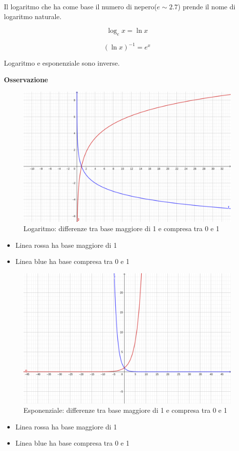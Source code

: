\documentclass{article}
\begin{document}
Il logaritmo che ha come base il numero di nepero($e \sim 2.7$) prende il nome di logaritmo naturale.


\begin{equation*}
    \log_e x = \ln x
\end{equation*}

\begin{equation*}
    (\ln x)^{-1} = e^x
\end{equation*}

Logaritmo e esponenziale sono inverse.

\textbf{Osservazione}
\begin{figure}[h!]
    \centering
    \includegraphics[width=0.5\linewidth]{imgs/log.png}
    \caption{Logaritmo: differenze tra base maggiore di 1 e compresa tra 0 e 1}
    \label{fig:log}
\end{figure}

\begin{itemize}
    \item Linea rossa ha base maggiore di 1
    \item Linea blue ha base compresa tra 0 e 1
\end{itemize}



\begin{figure}[h!]
    \centering
    \includegraphics[width=0.5\linewidth]{imgs/exp.png}
    \caption{Esponenziale: differenze tra base maggiore di 1 e compresa tra 0 e 1}
    \label{fig:exp}
\end{figure}

\begin{itemize}
    \item Linea rossa ha base maggiore di 1
    \item Linea blue ha base compresa tra 0 e 1
\end{itemize}
\end{document}
